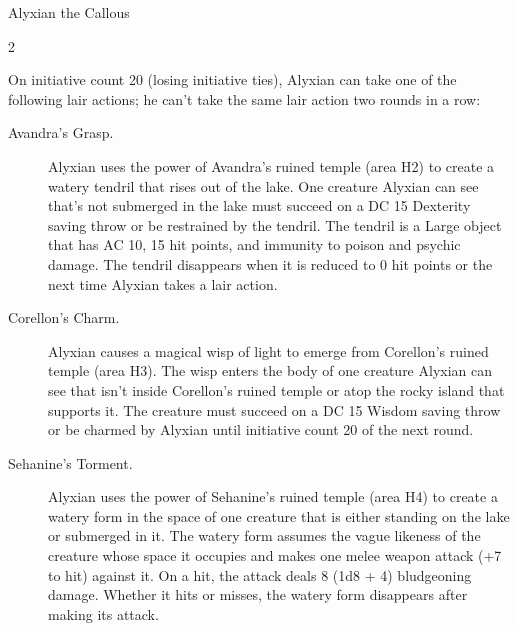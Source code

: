 \documentclass[10pt,a4paper,twoside,bg=print,twocolumn,openany,nodeprecatedcode]{dndbook}
\begin{document}
\begin{DndMonster}[float*=b,width=\textwidth + 8pt]{Alyxian the Callous}
\begin{multicols}{2}
\begin{DndMonsterLegendaryActions}
\end{DndMonsterLegendaryActions}
On initiative count 20 (losing initiative ties), Alyxian can take one of the following lair actions; he can't take the same lair action two rounds in a row:


\begin{description}
\item[Avandra's Grasp.]
Alyxian uses the power of Avandra's ruined temple (area H2) to create a watery tendril that rises out of the lake. One creature Alyxian can see that's not submerged in the lake must succeed on a DC 15 Dexterity saving throw or be restrained by the tendril. The tendril is a Large object that has AC 10, 15 hit points, and immunity to poison and psychic damage. The tendril disappears when it is reduced to 0 hit points or the next time Alyxian takes a lair action.

\item[Corellon's Charm.]
Alyxian causes a magical wisp of light to emerge from Corellon's ruined temple (area H3). The wisp enters the body of one creature Alyxian can see that isn't inside Corellon's ruined temple or atop the rocky island that supports it. The creature must succeed on a DC 15 Wisdom saving throw or be charmed by Alyxian until initiative count 20 of the next round.

\item[Sehanine's Torment.]
Alyxian uses the power of Sehanine's ruined temple (area H4) to create a watery form in the space of one creature that is either standing on the lake or submerged in it. The watery form assumes the vague likeness of the creature whose space it occupies and makes one melee weapon attack (+7 to hit) against it. On a hit, the attack deals 8 (1d8 + 4) bludgeoning damage. Whether it hits or misses, the watery form disappears after making its attack.


\end{description}
\end{multicols}
\end{DndMonster}
\end{document}
